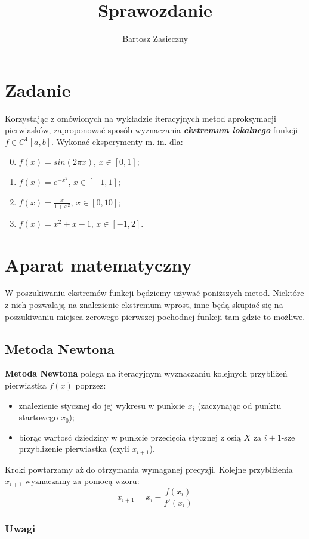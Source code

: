 \documentclass[a4paper,11pt]{article}
\title{Sprawozdanie}
\author{Bartosz Zasieczny}
\begin{document}
\maketitle
\tableofcontents

\section{Zadanie}
Korzystając z omówionych na wykładzie iteracyjnych metod aproksymacji pierwiasków, zaproponować sposób wyznaczania \textbf{\emph{ekstremum lokalnego}} funkcji \( f \in C^1[a,b] \). Wykonać eksperymenty m. in. dla:
\begin{enumerate}
  \setcounter{enumi}{-1}
  \item \( f(x) = sin(2 \pi x) \), \( x \in [0,1] \); 
  \item \( f(x) = e^{-x^2} \), \( x \in [-1, 1] \); 
  \item\( f(x) = \frac {x} {1+x^2} \), \( x \in [0,10] \); 
  \item\( f(x) = x^2 + x - 1 \), \( x \in [-1,2] \).
\end{enumerate}

\section{Aparat matematyczny}
  W poszukiwaniu ekstremów funkcji będziemy używać poniższych metod. Niektóre z nich pozwalają na znalezienie ekstremum wprost, inne będą skupiać się na poszukiwaniu miejsca zerowego pierwszej pochodnej funkcji tam gdzie to możliwe.
  \subsection{Metoda Newtona}
  \textbf{Metoda Newtona} polega na iteracyjnym wyznaczaniu kolejnych przybliżeń pierwiastka \( f(x) \) poprzez: 
  \begin{itemize}
    \item znalezienie stycznej do jej wykresu w punkcie \(x_i\) (zaczynając od punktu startowego \(x_0\)); 
    \item biorąc wartosć dziedziny w punkcie przecięcia stycznej z osią \(X\) za \(i+1\)-sze przyblizenie pierwiastka (czyli \( x_{i+1} \)).
  \end{itemize}
  Kroki powtarzamy aż do otrzymania wymaganej precyzji.
  Kolejne przybliżenia \( x_{i+1} \) wyznaczamy za pomocą wzoru:
  $$ x_{i+1} = x_i - \frac {f(x_i)} {f'(x_i)} $$
  \subsubsection{Uwagi}
  
\end{document}
